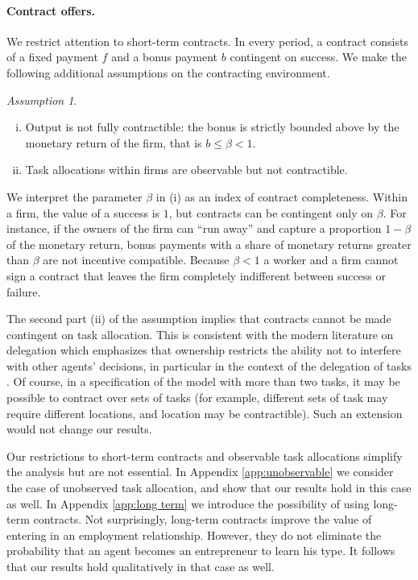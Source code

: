 \documentclass[12pt,american]{paper}
\theoremstyle{remark}
\newtheorem{ass}{Assumption}
\begin{document}
\paragraph{Contract offers.} 
We restrict attention to short-term contracts. In every period, a contract consists of a fixed payment $f$ and a bonus payment $b$ contingent on success. We make the following additional assumptions on the contracting environment.

\begin{ass}
\hspace{1cm}
\begin{enumerate}[(i)]
\item Output is not fully contractible: the bonus is strictly bounded above by the monetary return of the firm, that is $b\leq \beta < 1$.
\item Task allocations within firms are observable but not contractible.
\end{enumerate} 
\end{ass}
%
We interpret the parameter $\beta$ in (i) as an index of contract completeness. Within a firm, the value of a success is $1$, but contracts can be contingent only on $\beta$. For instance, if the owners of the firm can ``run away''  and capture a proportion $1-\beta$ of the monetary return, bonus payments with a share of monetary returns greater than $\beta$ are not incentive compatible.  Because $\beta < 1$ a worker and a firm cannot sign a contract that leaves the firm completely indifferent between success or failure.

The second part (ii) of the assumption implies that contracts cannot be made contingent on task allocation. This is consistent with the modern literature on delegation which emphasizes that ownership  restricts the ability not to interfere with other agents' decisions, in particular in the context of the delegation of tasks \citep{aghion1997a,Baker:1999fv}. %
Of course, in a specification of the model with more than two tasks, it may be possible to contract over sets of tasks (for example, different sets of task may require different locations, and location may be contractible). Such an extension would not change our results.%

Our restrictions to short-term contracts and observable task allocations simplify the analysis but are not essential. In Appendix \ref{app:unobservable}  we consider the case of unobserved task allocation, and show that our results hold in this case as well. In Appendix \ref{app:long term} we introduce the possibility of using long-term contracts. Not surprisingly, long-term contracts improve the value of entering in an employment relationship. However, they do not eliminate the probability that an agent becomes an entrepreneur to learn his type. It follows that our results hold qualitatively in that case as well.
\end{document}
